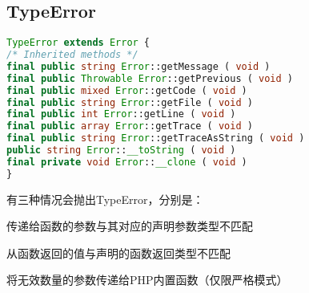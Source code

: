 \subsection{TypeError}

\begin{lstlisting}[language=PHP]
TypeError extends Error {
/* Inherited methods */
final public string Error::getMessage ( void )
final public Throwable Error::getPrevious ( void )
final public mixed Error::getCode ( void )
final public string Error::getFile ( void )
final public int Error::getLine ( void )
final public array Error::getTrace ( void )
final public string Error::getTraceAsString ( void )
public string Error::__toString ( void )
final private void Error::__clone ( void )
}
\end{lstlisting}

有三种情况会抛出TypeError，分别是：

\begin{compactitem}
\item 传递给函数的参数与其对应的声明参数类型不匹配
\item 从函数返回的值与声明的函数返回类型不匹配
\item 将无效数量的参数传递给PHP内置函数（仅限严格模式）
\end{compactitem}